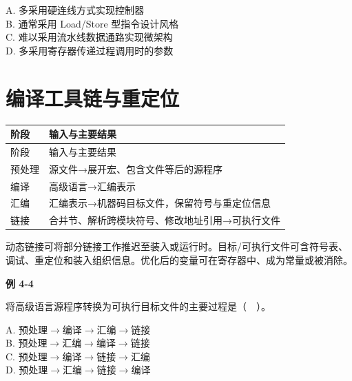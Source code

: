 A. 多采用硬连线方式实现控制器\\
B. 通常采用 Load/Store 型指令设计风格\\
C. 难以采用流水线数据通路实现微架构\\
D. 多采用寄存器传递过程调用时的参数

\section{编译工具链与重定位}\label{CO04-toolchain}

\par\smallskip
{\fontsize{9.3}{12}\selectfont\setlength{\tabcolsep}{2.5pt}\setlength{\LTleft}{0pt}\setlength{\LTright}{0pt}
\begin{longtable}{@{}>{\raggedright\arraybackslash}p{}>{\raggedright\arraybackslash}p{}@{}}
\toprule
阶段 & 输入与主要结果 \\

\midrule\endfirsthead\toprule
阶段 & 输入与主要结果 \\

\midrule\endhead\bottomrule\endfoot
预处理 & 源文件→展开宏、包含文件等后的源程序 \\

编译 & 高级语言→汇编表示 \\

汇编 & 汇编表示→机器码目标文件，保留符号与重定位信息 \\

链接 & 合并节、解析跨模块符号、修改地址引用→可执行文件 \\

\end{longtable}}
\par\smallskip

动态链接可将部分链接工作推迟至装入或运行时。目标/可执行文件可含符号表、调试、重定位和装入组织信息。优化后的变量可在寄存器中、成为常量或被消除。

\par\medskip{}\noindent\hypertarget{CO04-E04}{}\label{CO04-E04}\textbf{例 4-4}\par\nobreak\smallskip

将高级语言源程序转换为可执行目标文件的主要过程是（　）。

A. 预处理\ensuremath{\to}编译\ensuremath{\to}汇编\ensuremath{\to}链接\\
B. 预处理\ensuremath{\to}汇编\ensuremath{\to}编译\ensuremath{\to}链接\\
C. 预处理\ensuremath{\to}编译\ensuremath{\to}链接\ensuremath{\to}汇编\\
D. 预处理\ensuremath{\to}汇编\ensuremath{\to}链接\ensuremath{\to}编译

